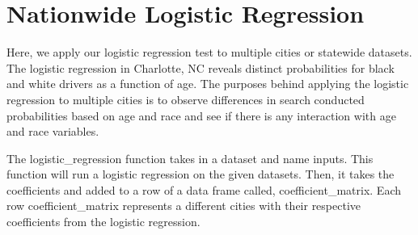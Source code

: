 \documentclass[
]{book}
\begin{document}
\hypertarget{nationwide-logistic-regression}{%
\chapter{Nationwide Logistic Regression}\label{nationwide-logistic-regression}}

Here, we apply our logistic regression test to multiple cities or statewide datasets. The logistic regression in Charlotte, NC reveals distinct probabilities for black and white drivers as a function of age. The purposes behind applying the logistic regression to multiple cities is to observe differences in search conducted probabilities based on age and race and see if there is any interaction with age and race variables.

The logistic\_regression function takes in a dataset and name inputs. This function will run a logistic regression on the given datasets. Then, it takes the coefficients and added to a row of a data frame called, coefficient\_matrix. Each row coefficient\_matrix represents a different cities with their respective coefficients from the logistic regression.
\end{document}
